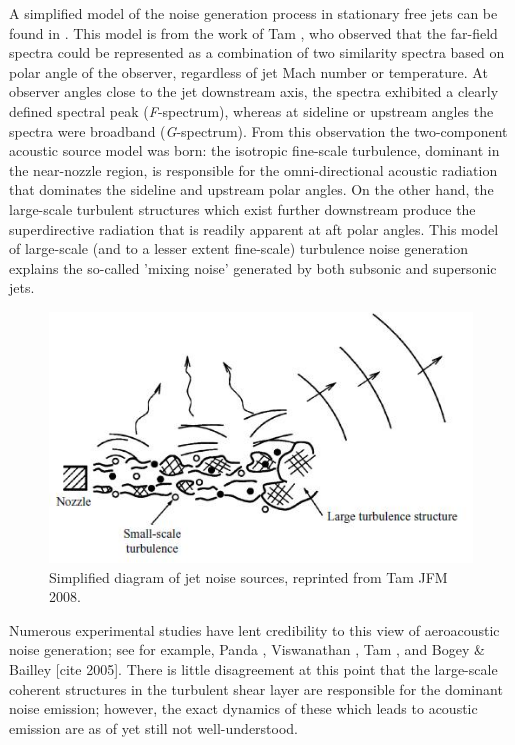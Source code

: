 A simplified model of the noise generation process in stationary free jets can be found in . 
This model is from the work of Tam \etal \citep{Tam1996, Tam2008}, who observed that the far-field spectra could be represented as a combination of two similarity spectra based on polar angle of the observer, regardless of jet Mach number or temperature.
At observer angles close to the jet downstream axis, the spectra exhibited a clearly defined spectral peak (\emph{F}-spectrum), whereas at sideline or upstream angles the spectra were broadband (\emph{G}-spectrum).
From this observation the two-component acoustic source model was born: the isotropic fine-scale turbulence, dominant in the near-nozzle region, is responsible for the omni-directional acoustic radiation that dominates the sideline and upstream polar angles. 
On the other hand, the large-scale turbulent structures which exist further downstream produce the superdirective radiation that is readily apparent at aft polar angles. 
This model of large-scale (and to a lesser extent fine-scale) turbulence noise generation explains the so-called 'mixing noise' generated by both subsonic and supersonic jets.
\begin{figure}
	\centering
	\includegraphics[width=5in]{Figures/JetNoiseSourceDiagramTMP.jpg}
	\caption{Simplified diagram of jet noise sources, reprinted from Tam \etal JFM 2008.}
	\label{fig:jet_sources_diagram}
\end{figure}
Numerous experimental studies have lent credibility to this view of aeroacoustic noise generation; see for example, Panda \etal [cite], Viswanathan \etal [cite], Tam \etal [cite], and Bogey \& Bailley [cite 2005].
There is little disagreement at this point that the large-scale coherent structures in the turbulent shear layer are responsible for the dominant noise emission; however, the exact dynamics of these which leads to acoustic emission are as of yet still not well-understood. 


